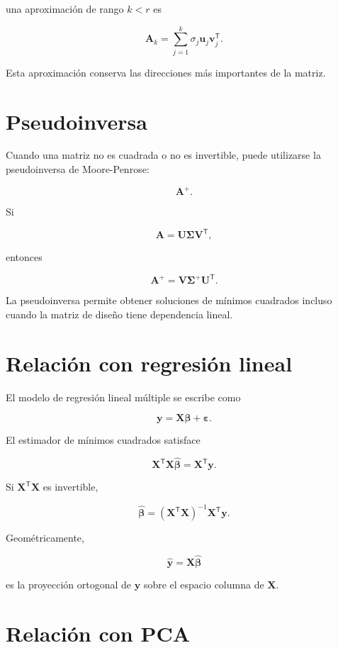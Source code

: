 \documentclass[
  spanish,
  11pt,
  letterpaper,
  DIV=11,
  numbers=noendperiod]{scrreprt}
\theoremstyle{definition}
\theoremstyle{plain}
\theoremstyle{definition}
\theoremstyle{remark}
\begin{document}
una aproximación de rango \(k<r\) es

\[
\mathbf{A}_k
=
\sum_{j=1}^{k}
\sigma_j
\mathbf{u}_j
\mathbf{v}_j^{\mathsf T}.
\]

Esta aproximación conserva las direcciones más importantes de la matriz.

\section{Pseudoinversa}\label{pseudoinversa}

Cuando una matriz no es cuadrada o no es invertible, puede utilizarse la
pseudoinversa de Moore-Penrose:

\[
\mathbf{A}^{+}.
\]

Si

\[
\mathbf{A}
=
\mathbf{U}
\boldsymbol{\Sigma}
\mathbf{V}^{\mathsf T},
\]

entonces

\[
\mathbf{A}^{+}
=
\mathbf{V}
\boldsymbol{\Sigma}^{+}
\mathbf{U}^{\mathsf T}.
\]

La pseudoinversa permite obtener soluciones de mínimos cuadrados incluso
cuando la matriz de diseño tiene dependencia lineal.

\section{Relación con regresión
lineal}\label{relaciuxf3n-con-regresiuxf3n-lineal}

El modelo de regresión lineal múltiple se escribe como

\[
\mathbf{y}
=
\mathbf{X}\boldsymbol{\beta}
+
\boldsymbol{\varepsilon}.
\]

El estimador de mínimos cuadrados satisface

\[
\mathbf{X}^{\mathsf T}
\mathbf{X}
\widehat{\boldsymbol{\beta}}
=
\mathbf{X}^{\mathsf T}\mathbf{y}.
\]

Si \(\mathbf{X}^{\mathsf T}\mathbf{X}\) es invertible,

\[
\widehat{\boldsymbol{\beta}}
=
(\mathbf{X}^{\mathsf T}\mathbf{X})^{-1}
\mathbf{X}^{\mathsf T}\mathbf{y}.
\]

Geométricamente,

\[
\widehat{\mathbf{y}}
=
\mathbf{X}
\widehat{\boldsymbol{\beta}}
\]

es la proyección ortogonal de \(\mathbf{y}\) sobre el espacio columna de
\(\mathbf{X}\).

\section{Relación con PCA}\label{relaciuxf3n-con-pca}
\end{document}
